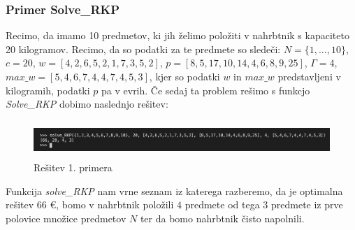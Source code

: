 \documentclass[a4paper,12pt]{article}
\theoremstyle{definition}
\begin{document}
\subsubsection{Primer Solve\_RKP}

Recimo, da imamo 10 predmetov, ki jih želimo položiti v nahrbtnik s kapaciteto 20 kilogramov. Recimo, da so podatki za te predmete so sledeči: 
$N = \{1, \dots, 10\}$, $c = 20$, $w = [4, 2, 6, 5, 2, 1, 7, 3, 5, 2]$, $p = [8, 5, 17, 10, 14, 4, 6, 8, 9, 25]$, $\Gamma = 4$, 
$max\_w = [5, 4, 6, 7, 4, 4, 7, 4, 5, 3]$, kjer so podatki $w$ in $max\_w$ predstavljeni v kilogramih, podatki $p$ pa v evrih. Če sedaj ta problem 
rešimo s funkcjo \textit{Solve\_RKP} dobimo naslednjo rešitev:

\begin{figure}[h]
    \includegraphics[width=14cm, height = 1.4cm]{primer1.png}
    \caption{Rešitev 1. primera}
    \label{fig:koda2}    
\end{figure}

\noindent Funkcija \textit{solve\_RKP} nam vrne seznam iz katerega razberemo, da je optimalna rešitev 66
 \euro, bomo v nahrbtnik položili $4$ predmete od tega $3$ predmete iz prve polovice množice predmetov $N$ ter da bomo nahrbtnik čisto napolnili.
\end{document}
